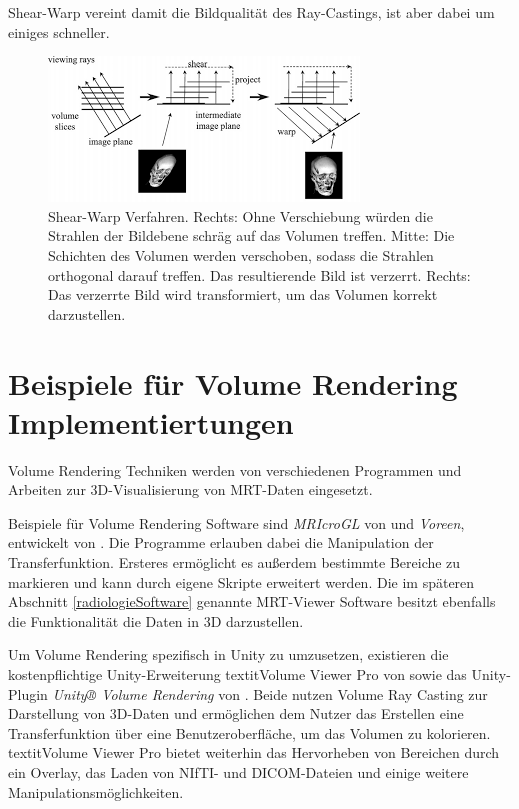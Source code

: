 Shear-Warp vereint damit die Bildqualität des Ray-Castings, ist aber dabei um einiges schneller.

\begin{figure}
	\centering
	\includegraphics[width=0.7\linewidth]{images/shearwarp.png}
	\caption{Shear-Warp Verfahren. Rechts: Ohne Verschiebung würden die Strahlen der Bildebene schräg auf das Volumen treffen. Mitte: Die Schichten des Volumen werden verschoben, sodass die Strahlen orthogonal darauf treffen. Das resultierende Bild ist verzerrt. Rechts: Das verzerrte Bild wird transformiert, um das Volumen korrekt darzustellen.}
	\label{img:shearwarp}
\end{figure}

\section{Beispiele für Volume Rendering Implementiertungen}

Volume Rendering Techniken werden von verschiedenen Programmen und Arbeiten zur 3D-Visualisierung von MRT-Daten eingesetzt.

Beispiele für Volume Rendering Software sind \textit{MRIcroGL} von \citet{MRIcroGL} und \textit{Voreen}, entwickelt von \citet{voreen}. Die Programme erlauben dabei die Manipulation der Transferfunktion. Ersteres ermöglicht es außerdem bestimmte Bereiche zu markieren und kann durch eigene Skripte erweitert werden.
Die im späteren Abschnitt \ref{radiologieSoftware} genannte MRT-Viewer Software besitzt ebenfalls die Funktionalität die Daten in 3D darzustellen.

Um Volume Rendering spezifisch in Unity zu umzusetzen, existieren die kostenpflichtige Unity-Erweiterung textit{Volume Viewer Pro} von \citet{volumeViewerPro} sowie das Unity-Plugin \textit{Unity® Volume Rendering} von \citet{volumeRenderingUnity}. Beide nutzen Volume Ray Casting zur Darstellung von 3D-Daten und ermöglichen dem Nutzer das Erstellen eine Transferfunktion über eine Benutzeroberfläche, um das Volumen zu kolorieren. textit{Volume Viewer Pro} bietet weiterhin das Hervorheben von Bereichen durch ein Overlay, das Laden von NIfTI- und DICOM-Dateien und einige weitere Manipulationsmöglichkeiten. 


